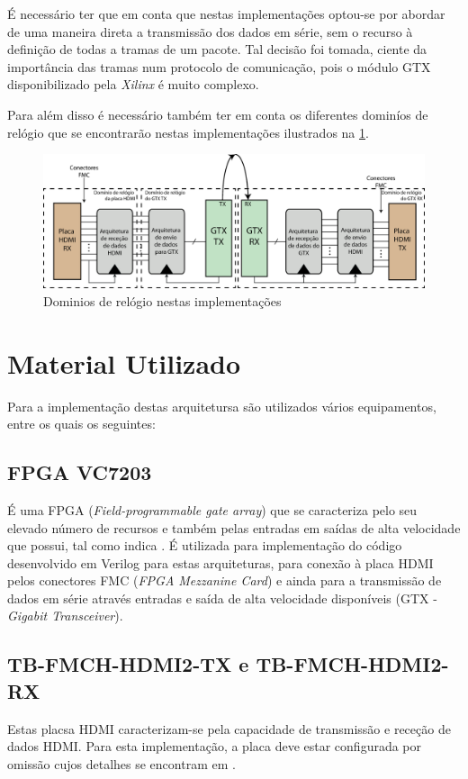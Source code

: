 \documentclass[11pt,a4paper]{article}
\begin{document}
	É necessário ter que em conta que nestas implementações optou-se por abordar de uma maneira direta a transmissão dos dados em série, sem o recurso à definição de todas a tramas de um pacote. Tal decisão foi tomada, ciente da importância das tramas num protocolo de comunicação, pois o módulo GTX disponibilizado pela \textit{Xilinx} é muito complexo.
	
	Para além disso é necessário também ter em conta os diferentes dominíos de relógio que se encontrarão nestas implementações ilustrados na \cref{fig:dominos}.
	
		\begin{figure}[h!]
			\begin{center}
				\includegraphics[width=1.0\textwidth]{diagrama_dominios} 
				\caption{Dominios de relógio nestas implementações}
				\label{fig:dominos}
			\end{center}
		\end{figure}
	
	\section{Material Utilizado}
	Para a implementação destas arquitetursa são utilizados vários equipamentos, entre os quais os seguintes:
	\subsection{FPGA VC7203}
	É uma FPGA (\textit{Field-programmable gate array}) que se caracteriza pelo seu elevado número de recursos e também pelas entradas em saídas de alta velocidade que possui, tal como indica \cite{R008}. É utilizada para implementação do código desenvolvido em Verilog para estas arquiteturas, para conexão à placa HDMI pelos conectores FMC (\textit{FPGA Mezzanine Card}) e ainda para a transmissão de dados em série através entradas e saída de alta velocidade disponíveis (GTX - \textit{Gigabit Transceiver}).
	\subsection{TB-FMCH-HDMI2-TX e TB-FMCH-HDMI2-RX}
	Estas placsa HDMI caracterizam-se pela capacidade de transmissão e receção de dados HDMI. Para esta implementação, a placa deve estar configurada por omissão cujos detalhes se encontram em \cite{R009}.
	
\end{document}

